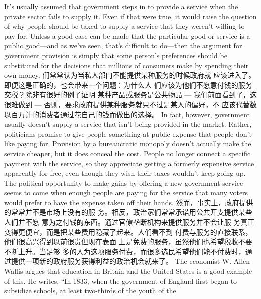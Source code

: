 \begin{paracol}{2}
It's usually assumed that government steps in to provide a service when the private sector fails to supply it. Even if that were
true, it would raise the question of why people should be taxed
to supply a service that they weren't willing to pay for. Unless a
good case can be made that the particular good or service is a
public good---and as we've seen, that's difficult to do---then
the argument for government provision is simply that some
person's preferences should be substituted for the decisions that
millions of consumers make by spending their own money.
\switchcolumn
们常常认为当私人部门不能提供某种服务的时候政府就
应该进入了。即便这是正确的，也会带来一个问题：为什么人
们应该为他们不愿意付钱的服务交税？除非有很好的例子证明
某种产品或服务是公共物品 --- 我们前面看到了，这很难做到
--- 否则，要求政府提供某种服务就只不过是某人的偏好，不
应该代替数以百万计的消费者通过花自己的钱而做出的选择。
\switchcolumn*
In fact, however, government usually doesn't supply a service
that isn't being provided in the market. Rather, politicians
promise to give people something at public expense that people
don't like paying for. Provision by a bureaucratic monopoly
doesn't actually make the service cheaper, but it does conceal
the cost. People no longer connect a specific payment with the
service, so they appreciate getting a formerly expensive service
apparently for free, even though they wish their taxes wouldn't
keep going up. The political opportunity to make gains by offering a new government service seems to come when enough
people are paying for the service that many voters would prefer
to have the expense taken off their hands.
\switchcolumn
然而，事实上，政府提供的常常并不是市场上没有的服
务。相反，政治家们常常承诺用公共开支提供某些人们并不愿
意为之付钱的东西。通过官僚垄断机构来提供服务并不会让服
务真正变得更便宜，而是把某些费用隐藏了起来。人们看不到
付费与服务的直接联系，他们很高兴得到以前很贵但现在表面
上是免费的服务，虽然他们也希望税收不要不断上升。当足够
多的人为这项服务付费，而很多选民希望他们能不付费时，通过提供一项新的政府服务获得利益的政治机会就来了。
\switchcolumn*
The economist W. Allen Wallis argues that education in
Britain and the United States is a good example of this. He
writes, ``In 1833, when the government of England first began to subsidize schools, at least two-thirds of the youth of the

\end{paracol}
